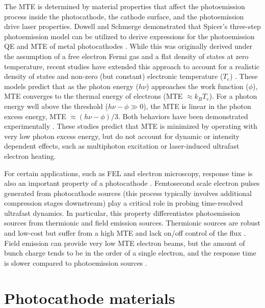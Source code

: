 The MTE is determined by material properties that affect the photoemission process inside the photocathode, the cathode surface, and the photoemission drive laser properties.
Dowell and Schmerge demonstrated that Spicer's three-step photoemission model \cite{spicer1964} can be utilized to derive expressions for the photoemission QE and MTE of metal photocathodes \cite{dowell2009_QuantumEfficiencyThermal}. While this was originally derived under the assumption of a free electron Fermi gas and a flat density of states at zero temperature,  recent studies have extended this approach to account for a realistic density of states and non-zero (but constant) electronic temperature ($T_e$) \cite{Dimitrov2017,Feng2015}. These models predict that as the photon energy ($h\nu$) approaches the work function ($\phi$), MTE converges to the thermal energy of electrons (MTE $\approx k_B T_e$). For a photon energy well above the threshold ($h\nu - \phi \gg 0$), the MTE is linear in the photon excess energy, MTE $ \approx (h\nu-\phi)/3$. Both behaviors have been demonstrated experimentally \cite{Feng2015}. These studies predict that MTE is minimized by operating with very low photon excess energy, but do not account for dynamic or intensity dependent effects, such as multiphoton excitation or laser-induced ultrafast electron heating.

For certain applications, such as FEL and electron microscopy, response time is also an important property of a photocathode \cite{musumeci2018advances}.
Femtosecond scale electron pulses generated from photocathode sources (this process typically involves additional compression stages downstream) play a critical role in probing time-resolved ultrafast dynamics.
In particular, this property differentiates photoemission sources from thermionic and field emission sources.
Thermionic sources are robust and low-cost but suffer from a high MTE and lack on/off control of the flux \cite{herring1949thermionic}.
Field emission can provide very low MTE electron beams, but the amount of bunch charge tends to be in the order of a single electron, and the response time is slower compared to photoemission sources \cite{batson2002sub}.


\section{Photocathode materials}

